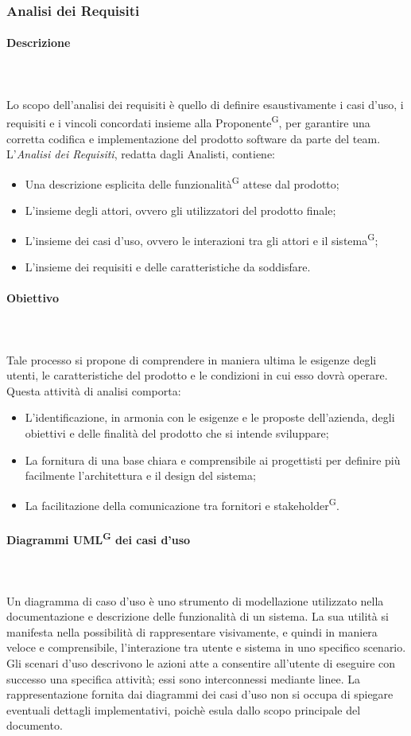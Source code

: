 \documentclass[8pt]{article}
\newcommand{\glossterm}[1]{#1\textsuperscript{G}} %
\newcommand{\subsubsubsection}[1]{\paragraph{#1}\mbox{}\\}
\begin{document}
\subsubsection{Analisi dei Requisiti} \label{sec:analisi-rischi}

\subsubsubsection{Descrizione}\\
Lo scopo dell'analisi dei requisiti è quello di definire esaustivamente i casi d'uso, i requisiti e i vincoli concordati insieme alla \glossterm{Proponente}, per garantire una corretta codifica e implementazione del prodotto software da parte del team.\\
L'\textit{Analisi dei Requisiti}, redatta dagli Analisti, contiene:
\begin{itemize}
    \item Una descrizione esplicita delle \glossterm{funzionalità} attese dal prodotto;
    \item L'insieme degli attori, ovvero gli utilizzatori del prodotto finale;
    \item L'insieme dei casi d'uso, ovvero le interazioni tra gli attori e il \glossterm{sistema};
    \item L'insieme dei requisiti e delle caratteristiche da soddisfare.
\end{itemize}
\subsubsubsection{Obiettivo}\\
Tale processo si propone di comprendere in maniera ultima le esigenze degli utenti, le caratteristiche del prodotto e le condizioni in cui esso dovrà operare.\\
Questa attività di analisi comporta:
\begin{itemize}
    \item L'identificazione, in armonia con le esigenze e le proposte dell'azienda, degli obiettivi e delle finalità del prodotto che si intende sviluppare;
    \item La fornitura di una base chiara e comprensibile ai progettisti per definire più facilmente l'architettura e il design del sistema;
    \item La facilitazione della comunicazione tra fornitori e \glossterm{stakeholder}.
\end{itemize}
\subsubsubsection{Diagrammi \glossterm{UML} dei casi d'uso}\\
Un diagramma di caso d'uso è uno strumento di modellazione utilizzato nella documentazione e descrizione delle funzionalità di un sistema. La sua utilità si manifesta nella possibilità di rappresentare visivamente, e quindi in maniera veloce e comprensibile, l'interazione tra utente e sistema in uno specifico scenario. Gli scenari d'uso descrivono le azioni atte a consentire all'utente di eseguire con successo una specifica attività; essi sono interconnessi mediante linee. La rappresentazione fornita dai diagrammi dei casi d'uso non si occupa di spiegare eventuali dettagli implementativi, poichè esula dallo scopo principale del documento.\\
\end{document}
